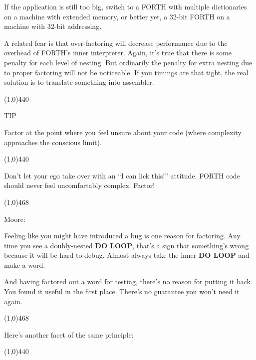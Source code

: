 \documentclass{book}
\begin{document}
If the application is still too big, switch to a FORTH with multiple dictionaries on a machine with extended memory, or better yet, a 32-bit FORTH on a machine with 32-bit addressing.

A related fear is that over-factoring will decrease performance due to the overhead of FORTH's inner interpreter. Again, it's true that there is some penalty for each level of nesting. But ordinarily the penalty for extra nesting due to proper factoring will not be noticeable. If you timings are that tight, the real solution is to translate something into assembler.

\line(1,0){440} 

\begin{list}{}{}

\item
TIP

\item
Factor at the point where you feel unsure about your code (where complexity approaches the conscious limit).

\end{list}{}{}

\line(1,0){440}

\bigskip

\noindent
Don't let your ego take over with an ``I can lick this!'' attitude. FORTH code should never feel uncomfortably complex. Factor!

\noindent
\line(1,0){468}

\noindent
Moore:

\begin{list}{}{}

\item
Feeling like you might have introduced a bug is one reason for factoring. Any time you see a doubly-nested \textbf{DO LOOP}, that's a sign that something's wrong because it will be hard to debug. Almost always take the inner \textbf{DO LOOP} and make a word.

\item
And having factored out a word for testing, there's no reason for putting it back. You found it useful in the first place. There's no guarantee you won't need it again.

\end{list}{}{}

\noindent
\line(1,0){468}

\bigskip

\noindent
Here's another facet of the same principle:

\line(1,0){440} 
\end{document}
